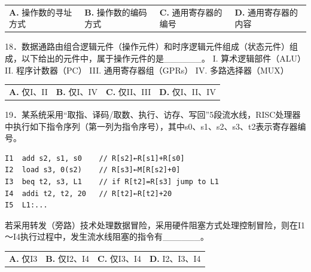 \documentclass[UTF8,11pt]{ctexart}
\begin{document}
\begin{center}\begin{tabular}{>{\raggedright\arraybackslash}p{\dimexpr(\linewidth-8\tabcolsep)/4\relax}>{\raggedright\arraybackslash}p{\dimexpr(\linewidth-8\tabcolsep)/4\relax}>{\raggedright\arraybackslash}p{\dimexpr(\linewidth-8\tabcolsep)/4\relax}>{\raggedright\arraybackslash}p{\dimexpr(\linewidth-8\tabcolsep)/4\relax}}
\textbf{A.} 操作数的寻址方式 & \textbf{B.} 操作数的编码方式 & \textbf{C.} 通用寄存器的编号 & \textbf{D.} 通用寄存器的内容\\[.35em]\end{tabular}\end{center}

18．数据通路由组合逻辑元件（操作元件）和时序逻辑元件组成（状态元件）组成，以下给出的元件中，属于操作元件的是\_\_\_\_\_\_。 I. 算术逻辑部件（ALU） II. 程序计数器（PC） III. 通用寄存器组（GPRs） IV. 多路选择器（MUX）


\begin{center}\begin{tabular}{>{\raggedright\arraybackslash}p{\dimexpr(\linewidth-8\tabcolsep)/4\relax}>{\raggedright\arraybackslash}p{\dimexpr(\linewidth-8\tabcolsep)/4\relax}>{\raggedright\arraybackslash}p{\dimexpr(\linewidth-8\tabcolsep)/4\relax}>{\raggedright\arraybackslash}p{\dimexpr(\linewidth-8\tabcolsep)/4\relax}}
\textbf{A.} 仅I、II & \textbf{B.} 仅I、IV & \textbf{C.} 仅II、III & \textbf{D.} 仅I、II、IV\\[.35em]\end{tabular}\end{center}

19．某系统采用“取指、译码/取数、执行、访存、写回”5段流水线，RISC处理器中执行如下指令序列（第一列为指令序号），其中s0、s1、s2、s3、t2表示寄存器编号。


\begin{Verbatim}[breaklines,breakanywhere,fontsize=\small]
I1  add s2, s1, s0    // R[s2]←R[s1]+R[s0]
I2  load s3, 0(s2)    // R[s3]←M[R[s2]+0]
I3  beq t2, s3, L1    // if R[t2]=R[s3] jump to L1
I4  addi t2, t2, 20   // R[t2]←R[t2]+20
I5  L1:...
\end{Verbatim}

若采用转发（旁路）技术处理数据冒险，采用硬件阻塞方式处理控制冒险，则在I1～I4执行过程中，发生流水线阻塞的指令有\_\_\_\_\_\_。


\begin{center}\begin{tabular}{>{\raggedright\arraybackslash}p{\dimexpr(\linewidth-8\tabcolsep)/4\relax}>{\raggedright\arraybackslash}p{\dimexpr(\linewidth-8\tabcolsep)/4\relax}>{\raggedright\arraybackslash}p{\dimexpr(\linewidth-8\tabcolsep)/4\relax}>{\raggedright\arraybackslash}p{\dimexpr(\linewidth-8\tabcolsep)/4\relax}}
\textbf{A.} 仅I3 & \textbf{B.} 仅I2、I4 & \textbf{C.} 仅I3、I4 & \textbf{D.} I2、I3、I4\\[.35em]\end{tabular}\end{center}
\end{document}

